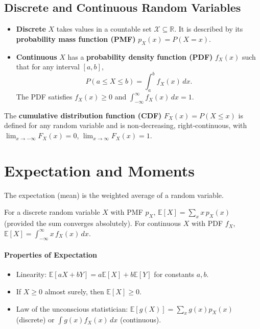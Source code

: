 \documentclass{tufte-handout}
\begin{document}
\subsection{Discrete and Continuous Random Variables}

\begin{itemize}
    \item \textbf{Discrete} $X$ takes values in a countable set $\mathcal{X} \subseteq \mathbb{R}$. It is described by its \textbf{probability mass function (PMF)} $p_X(x) = P(X = x)$.
    \item \textbf{Continuous} $X$ has a \textbf{probability density function (PDF)} $f_X(x)$ such that for any interval $[a,b]$,
    \[
    P(a \le X \le b) = \int_a^b f_X(x)\,dx.
    \]
    The PDF satisfies $f_X(x) \ge 0$ and $\int_{-\infty}^{\infty} f_X(x)\,dx = 1$.
\end{itemize}

The \textbf{cumulative distribution function (CDF)} $F_X(x) = P(X \le x)$ is defined for any random variable and is non‑decreasing, right‑continuous, with $\lim_{x\to-\infty}F_X(x)=0$, $\lim_{x\to\infty}F_X(x)=1$.

\begin{marginfigure}
\centering
{}
\caption{PDF of the standard normal distribution.}
\end{marginfigure}

\section{Expectation and Moments}

The expectation (mean) is the weighted average of a random variable.

\begin{defn}[Expectation]
    For a discrete random variable $X$ with PMF $p_X$, $\mathbb{E}[X] = \sum_{x} x\, p_X(x)$ (provided the sum converges absolutely). For continuous $X$ with PDF $f_X$, $\mathbb{E}[X] = \int_{-\infty}^{\infty} x\, f_X(x)\,dx$.
\end{defn}

\paragraph{Properties of Expectation}
\begin{itemize}
    \item Linearity: $\mathbb{E}[aX + bY] = a\mathbb{E}[X] + b\mathbb{E}[Y]$ for constants $a,b$.
    \item If $X \ge 0$ almost surely, then $\mathbb{E}[X] \ge 0$.
    \item Law of the unconscious statistician: $\mathbb{E}[g(X)] = \sum_x g(x)p_X(x)$ (discrete) or $\int g(x)f_X(x)\,dx$ (continuous).
\end{itemize}
\end{document}
